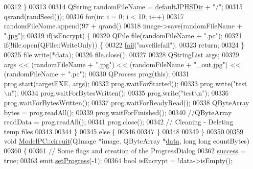 \begin{DoxyCode}
00312     \}
00313 
00314     QString randomFileName = \hyperlink{class_model_p_c_abd038306f14f22fb885a1697c96d6335}{defaultJPHSDir} + \textcolor{stringliteral}{"/"};
00315     qsrand(randSeed());
00316     \textcolor{keywordflow}{for}(\textcolor{keywordtype}{int} i = 0; i < 10; i++)
00317         randomFileName.append(97 + qrand() %
00318     image->save(randomFileName + \textcolor{stringliteral}{".jpg"});
00319     \textcolor{keywordflow}{if}(isEncrypt) \{
00320         QFile file(randomFileName + \textcolor{stringliteral}{".pc"});
00321         \textcolor{keywordflow}{if}(!file.open(QFile::WriteOnly)) \{
00322             \hyperlink{class_model_p_c_a47464b59b7e37fcee25e55475708aabd}{fail}(\textcolor{stringliteral}{"savefilefail"});
00323             \textcolor{keywordflow}{return};
00324         \}
00325         file.write(*data);
00326         file.close();
00327 
00328         QStringList args;
00329         args << (randomFileName + \textcolor{stringliteral}{".jpg"}) << (randomFileName + \textcolor{stringliteral}{"\_out.jpg"}) << (randomFileName + \textcolor{stringliteral}{".pc"});
00330         QProcess prog(\textcolor{keyword}{this});
00331         prog.start(targetEXE, args);
00332         prog.waitForStarted();
00333         prog.write(\textcolor{stringliteral}{"test\(\backslash\)n"});
00334         prog.waitForBytesWritten();
00335         prog.write(\textcolor{stringliteral}{"test\(\backslash\)n"});
00336         prog.waitForBytesWritten();
00337         prog.waitForReadyRead();
00338         QByteArray bytes = prog.readAll();
00339         prog.waitForFinished();
00340         \textcolor{comment}{//QByteArray readData = prog.readAll();}
00341         prog.close();
00342         \textcolor{comment}{// Cleaning - Deleting temp files}
00343 
00344     \}
00345     \textcolor{keywordflow}{else} \{
00346 
00347     \}
00348 
00349 \}
00350 
\hypertarget{modelpc_8cpp_source.tex_l00359}{}\hyperlink{class_model_p_c_a1d0091062a0c836b283ec2f67411623b}{00359} \textcolor{keywordtype}{void} \hyperlink{class_model_p_c_a1d0091062a0c836b283ec2f67411623b}{ModelPC::circuit}(QImage *image, QByteArray *\hyperlink{namespace_errors_dict_setup_af570460846fb9f0c91abd308a095dcdc}{data}, \textcolor{keywordtype}{long} \textcolor{keywordtype}{long} countBytes)
00360 \{
00361     \textcolor{comment}{// Some flags and creation of the ProgressDialog}
00362     \hyperlink{class_model_p_c_a945ffbbc44a832b953c191debd448f4c}{success} = \textcolor{keyword}{true};
00363     emit \hyperlink{class_model_p_c_afdcd80f0ed5062e145a71f09b0897547}{setProgress}(-1);
00364     \textcolor{keywordtype}{bool} isEncrypt = !data->isEmpty();

\end{DoxyCode}
